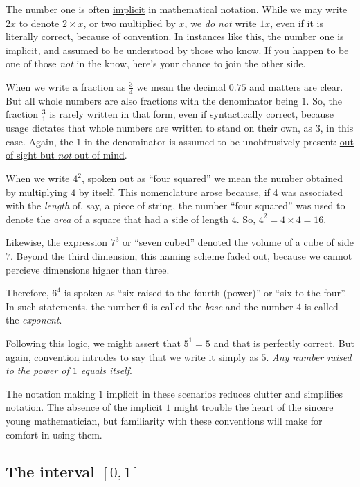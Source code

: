 \documentclass[
  a4paper,
]{article}
\begin{document}
The number one is often
\href{https://www.vocabulary.com/dictionary/implicit}{implicit} in
mathematical notation. While we may write \(2x\) to denote
\(2\times x\), or two multiplied by \(x\), we \emph{do not} write
\(1x\), even if it is literally correct, because of convention. In
instances like this, the number one is implicit, and assumed to be
understood by those who know. If you happen to be one of those
\emph{not} in the know, here's your chance to join the other side.

When we write a fraction as \(\frac{3}{4}\) we mean the decimal \(0.75\)
and matters are clear. But all whole numbers are also fractions with the
denominator being \(1\). So, the fraction \(\frac{3}{1}\) is rarely
written in that form, even if syntactically correct, because usage
dictates that whole numbers are written to stand on their own, as \(3\),
in this case. Again, the \(1\) in the denominator is assumed to be
unobtrusively present:
\href{https://dictionary.cambridge.org/dictionary/english/out-of-sight-out-of-mind}{out
of sight but \emph{not} out of mind}.

When we write \(4^2\), spoken out as ``four squared'' we mean the number
obtained by multiplying \(4\) by itself. This nomenclature arose
because, if 4 was associated with the \emph{length} of, say, a piece of
string, the number ``four squared'' was used to denote the \emph{area}
of a square that had a side of length \(4\). So,
\(4^2 = 4\times4 = 16\).

Likewise, the expression \(7^3\) or ``seven cubed'' denoted the volume
of a cube of side \(7\). Beyond the third dimension, this naming scheme
faded out, because we cannot percieve dimensions higher than three.

Therefore, \(6^4\) is spoken as ``six raised to the fourth (power)'' or
``six to the four''. In such statements, the number \(6\) is called the
\emph{base} and the number \(4\) is called the \emph{exponent}.

Following this logic, we might assert that \(5^1 = 5\) and that is
perfectly correct. But again, convention intrudes to say that we write
it simply as \(5\). \emph{Any number raised to the power of \(1\) equals
itself}.

The notation making \(1\) implicit in these scenarios reduces clutter
and simplifies notation. The absence of the implicit \(1\) might trouble
the heart of the sincere young mathematician, but familiarity with these
conventions will make for comfort in using them.

\hypertarget{the-interval-0-1}{%
\subsection{\texorpdfstring{The interval
\([0, 1]\)}{The interval {[}0, 1{]}}}\label{the-interval-0-1}}
\end{document}
